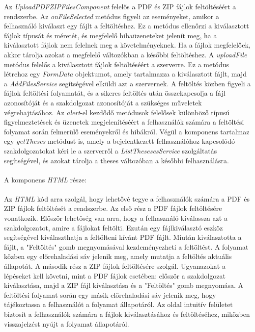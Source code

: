 Az \textit{UploadPDFZIPFilesComponent} felelős a PDF és ZIP fájlok feltöltéséért a rendszerbe. Az \textit{onFileSelected} metódus figyeli az eseményeket, amikor a felhasználó kiválaszt egy fájlt a feltöltéshez. Ez a metódus ellenőrzi a kiválasztott fájlok típusát és méretét, és megfelelő hibaüzeneteket jelenít meg, ha a kiválasztott fájlok nem felelnek meg a követelményeknek. Ha a fájlok megfelelőek, akkor tárolja azokat a megfelelő változókban a későbbi feltöltéshez. A \textit{uploadFile} metódus felelős a kiválasztott fájlok feltöltéséért a szerverre. Ez a metódus létrehoz egy \textit{FormData} objektumot, amely tartalmazza a kiválasztott fájlt, majd a \textit{AddFilesService} segítségével elküldi azt a szervernek. A feltöltés közben figyeli a fájlok feltöltési folyamatát, és a sikeres feltöltés után összekapcsolja a fájl azonosítóját és a szakdolgozat azonosítóját a szükséges műveletek végrehajtásához. Az \textit{alert}-el kezdődő metódusok felelősek különböző típusú figyelmeztetések és üzenetek megjelenítéséért a felhasználók számára a feltöltési folyamat során felmerülő eseményekről és hibákról. Végül a komponens tartalmaz egy \textit{getTheses} metódust is, amely a bejelentkezett felhasználóhoz kapcsolódó szakdolgozatokat kéri le a szerverről a \textit{ListThesesesService} szolgáltatás segítségével, és azokat tárolja a theses változóban a későbbi felhasználásra.\\
\\
A komponens \textit{HTML} része:\\
\\
Az \textit{HTML} kód arra szolgál, hogy lehetővé tegye a felhasználók számára a PDF és ZIP fájlok feltöltését a rendszerbe. Az első rész a PDF fájlok feltöltésére vonatkozik. Először lehetőség van arra, hogy a felhasználó kiválassza azt a szakdolgozatot, amire a fájlokat feltölti. Ezután egy fájlkiválasztó eszköz segítségével kiválaszthatja a feltölteni kívánt PDF fájlt. Miután kiválasztotta a fájlt, a "Feltöltés" gomb megnyomásával kezdeményezheti a feltöltést. A folyamat közben egy előrehaladási sáv jelenik meg, amely mutatja a feltöltés aktuális állapotát. A második rész a ZIP fájlok feltöltésére szolgál. Ugyanazokat a lépéseket kell követni, mint a PDF fájlok esetében: először a szakdolgozat kiválasztása, majd a ZIP fájl kiválasztása és a "Feltöltés" gomb megnyomása. A feltöltési folyamat során egy másik előrehaladási sáv jelenik meg, hogy tájékoztassa a felhasználót a folyamat állapotáról. Az oldal intuitív felületet biztosít a felhasználók számára a fájlok kiválasztásához és feltöltéséhez, miközben visszajelzést nyújt a folyamat állapotáról.

